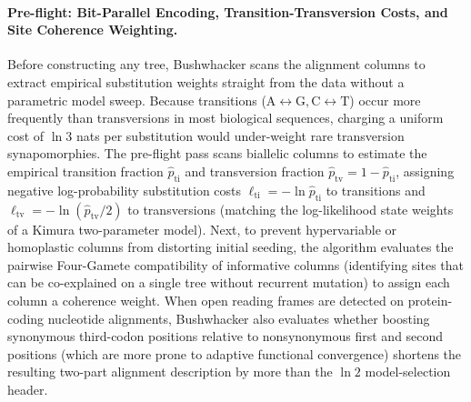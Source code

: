 \documentclass[11pt,a4paper]{article}
\begin{document}
\paragraph{Pre-flight: Bit-Parallel Encoding, Transition-Transversion Costs, and Site Coherence Weighting.}
Before constructing any tree, Bushwhacker scans the alignment columns to extract empirical substitution weights straight from the data without a parametric model sweep. Because transitions ($\text{A}\leftrightarrow\text{G}, \text{C}\leftrightarrow\text{T}$) occur more frequently than transversions in most biological sequences, charging a uniform cost of $\ln 3$ nats per substitution would under-weight rare transversion synapomorphies. The pre-flight pass scans biallelic columns to estimate the empirical transition fraction $\hat{p}_{\text{ti}}$ and transversion fraction $\hat{p}_{\text{tv}} = 1 - \hat{p}_{\text{ti}}$, assigning negative log-probability substitution costs $\ell_{\text{ti}} = -\ln\hat{p}_{\text{ti}}$ to transitions and $\ell_{\text{tv}} = -\ln(\hat{p}_{\text{tv}}/2)$ to transversions (matching the log-likelihood state weights of a Kimura two-parameter model). Next, to prevent hypervariable or homoplastic columns from distorting initial seeding, the algorithm evaluates the pairwise Four-Gamete compatibility of informative columns (identifying sites that can be co-explained on a single tree without recurrent mutation) to assign each column a coherence weight. When open reading frames are detected on protein-coding nucleotide alignments, Bushwhacker also evaluates whether boosting synonymous third-codon positions relative to nonsynonymous first and second positions (which are more prone to adaptive functional convergence) shortens the resulting two-part alignment description by more than the $\ln 2$ model-selection header.
\end{document}

